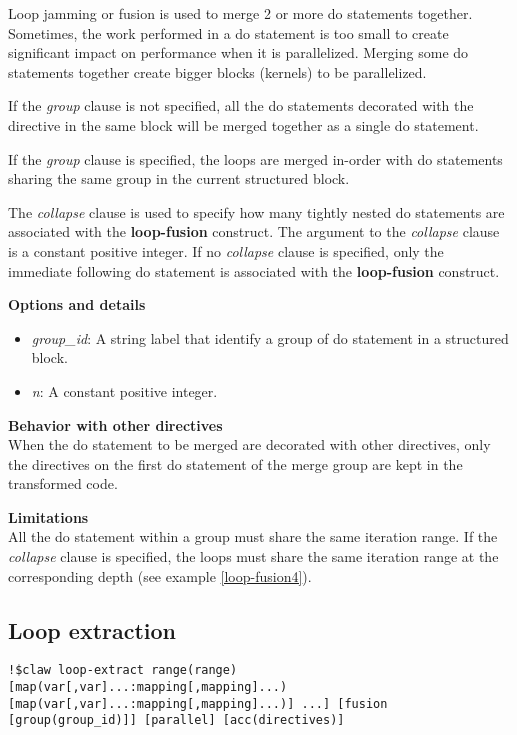 \documentclass{article}
\begin{document}
Loop jamming or fusion is used to merge 2 or more do statements together. Sometimes, the
work performed in a do statement is too small to create significant impact on
performance when it is parallelized. Merging some do statements together create bigger
blocks (kernels) to be parallelized.

If the \textit{group} clause is not specified, all the do statements decorated with the directive in the
same block will be merged together as a single do statement.

If the \textit{group} clause is specified, the loops are merged in-order with do statements sharing 
the same group in the current structured block.

The \textit{collapse} clause is used to specify how many tightly nested do statements are
associated with the \textbf{loop-fusion} construct. The argument to the \textit{collapse}
clause is a constant positive integer. If no \textit{collapse} clause
is specified, only the immediate following do statement is associated with the
\textbf{loop-fusion} construct.

\textbf{Options and details}
\begin{itemize}
\item \textit{group\_id}: A string label that identify a group of do statement in a structured block. 
\item \textit{n}: A constant positive integer.
\end{itemize}

\textbf{Behavior with other directives}\\
When the do statement to be merged are decorated with other directives, only the
directives on the first do statement of the merge group are kept in the transformed
code.

\textbf{Limitations}\\
All the do statement within a group must share the same iteration range. If the
\textit{collapse} clause is specified, the loops must share the same iteration range at the
corresponding depth (see example \ref{loop-fusion4}).

\subsection{Loop extraction}
\begin{lstlisting}
!$claw loop-extract range(range) [map(var[,var]...:mapping[,mapping]...) [map(var[,var]...:mapping[,mapping]...)] ...] [fusion [group(group_id)]] [parallel] [acc(directives)]
\end{lstlisting}
\end{document}

